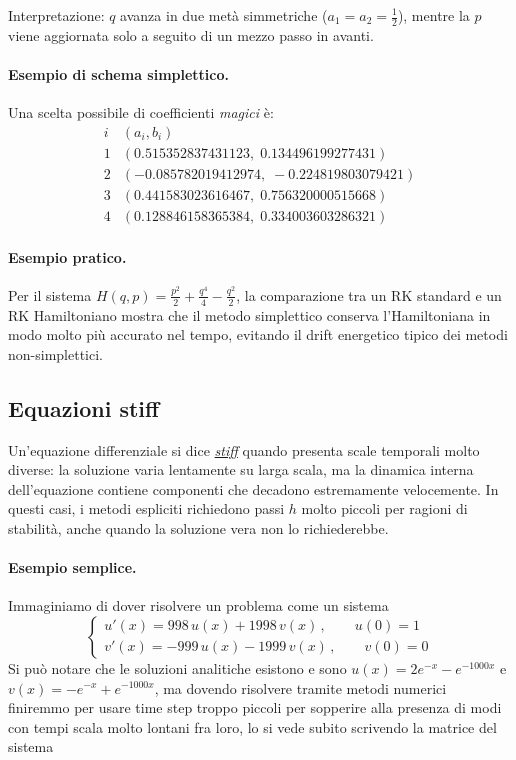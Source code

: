 \documentclass{article}
\begin{document}
	Interpretazione: $q$ avanza in due metà simmetriche ($a_1=a_2=\frac{1}{2}$), mentre la $p$ viene aggiornata solo a seguito di un mezzo passo in avanti.
	
	
	\paragraph{Esempio di schema simplettico.}
	Una scelta possibile di coefficienti \emph{magici} è:
	\[
	\begin{array}{c|c}
		i & (a_i, b_i) \\
		\hline
		1 & \left(0.515352837431123,\; 0.134496199277431\right)\\
		2 & \left(-0.085782019412974,\; -0.224819803079421\right)\\
		3 & \left(0.441583023616467,\; 0.756320000515668\right)\\
		4 & \left(0.128846158365384,\; 0.334003603286321\right)
	\end{array}
	\]
	
	\paragraph{Esempio pratico.}
	Per il sistema $H(q,p) = \frac{p^2}{2} + \frac{q^4}{4} - \frac{q^2}{2}$,
	la comparazione tra un RK standard e un RK Hamiltoniano mostra che il metodo
	simplettico conserva l'Hamiltoniana in modo molto più accurato nel tempo,
	evitando il drift energetico tipico dei metodi non-simplettici.
	
	
	\vspace{0.5cm}
	\subsection{Equazioni stiff}
	
	Un'equazione differenziale si dice \href{https://en.wikipedia.org/wiki/Stiff_equation}{\emph{stiff}} quando presenta scale temporali
	molto diverse: la soluzione varia lentamente su larga scala, ma la dinamica
	interna dell'equazione contiene componenti che decadono estremamente velocemente.
	In questi casi, i metodi espliciti richiedono passi $h$ molto piccoli per
	ragioni di stabilità, anche quando la soluzione vera non lo richiederebbe.
	
	\paragraph{Esempio semplice.}
	Immaginiamo di dover risolvere un problema come un sistema 
	\[
	\begin{cases}
		u'(x) = 998\, u(x) + 1998\, v(x)\,, \quad \quad u(0)=1\\
		v'(x) = -999\, u(x) - 1999\, v(x)\,, \quad \quad v(0)=0
	\end{cases}
	\]
	Si può notare che le soluzioni analitiche esistono e sono $u(x)=2e^{-x}-e^{-1000x}$ e $v(x)=-e^{-x}+e^{-1000x}$, ma dovendo risolvere tramite metodi numerici finiremmo per usare time step troppo piccoli per sopperire alla presenza di modi con tempi scala molto lontani fra loro, lo si vede subito scrivendo la matrice del sistema 
	
\end{document}
